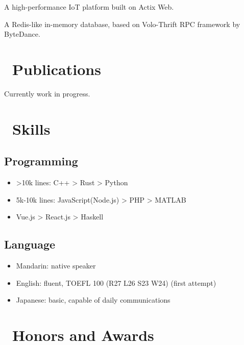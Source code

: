 \documentclass{resume}
\begin{document}
A high-performance IoT platform built on Actix Web.

A Redis-like in-memory database, based on Volo-Thrift RPC framework by ByteDance.

\section{\faBookmarkO\ Publications}
Currently work in progress.

\section{\faCogs\ Skills}
\subsection{\textbf{Programming}}
\begin{itemize}[parsep=0.5ex]
  \item >10k lines: C++ > Rust > Python
  \item 5k-10k lines: JavaScript(Node.js) > PHP > MATLAB
  \item <5k lines: Java > Vue.js > React.js > Haskell
\end{itemize}
\subsection{\textbf{Language}}
\begin{itemize}[parsep=0.5ex]
  \item Mandarin: native speaker
  \item English: fluent, TOEFL 100 (R27 L26 S23 W24) (first attempt)
  \item Japanese: basic, capable of daily communications
\end{itemize}

\section{\faHeartO\ Honors and Awards}
\end{document}
